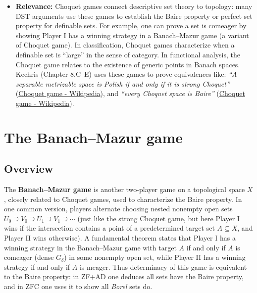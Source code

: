 \documentclass[11pt]{article}
\begin{document}
\begin{itemize}
\item \textbf{Relevance:} Choquet games connect descriptive set theory to topology:
many DST arguments use these games to establish the Baire property or
perfect set property for definable sets. For example, one can prove a
set is comeager by showing Player I has a winning strategy in a
Banach--Mazur game (a variant of Choquet game). In classification,
Choquet games characterize when a definable set is “large” in the
sense of category. In functional analysis, the Choquet game relates to
the existence of generic points in Banach spaces. Kechris (Chapter
8.C--E) uses these games to prove equivalences like: \emph{“A separable
metrizable space is Polish if and only if it is strong Choquet”}
(\href{https://en.wikipedia.org/wiki/Choquet\_game\#:\~:text=All\%20nonempty\%20complete\%20metric\%20spaces,displaystyle}{Choquet
game - Wikipedia}), and \emph{“every Choquet space is Baire”}
(\href{https://en.wikipedia.org/wiki/Choquet\_game\#:\~:text=if\%20Player\%20I\%20has\%20no,that\%20are}{Choquet
game - Wikipedia}).
\end{itemize}
\section{The Banach--Mazur game}
\label{the-banachmazur-game}
\subsection{Overview}
\label{overview-3}
The \textbf{Banach--Mazur game} is another two-player game on a topological
space \(X\), closely related to Choquet games, used to characterize the
Baire property. In one common version, players alternate choosing nested
nonempty open sets
\(U_0\supseteq V_0\supseteq U_1\supseteq V_1\supseteq\cdots\) (just like
the strong Choquet game, but here Player I wins if the intersection
contains a point of a predetermined target set \(A\subseteq X\), and
Player II wins otherwise). A fundamental theorem states that Player I
has a winning strategy in the Banach--Mazur game with target \(A\) if
and only if \(A\) is comeager (dense \(G_\delta\)) in some nonempty open
set, while Player II has a winning strategy if and only if \(A\) is
meager. Thus determinacy of this game is equivalent to the Baire
property: in ZF+AD one deduces all sets have the Baire property, and in
ZFC one uses it to show all \emph{Borel} sets do.
\end{document}
